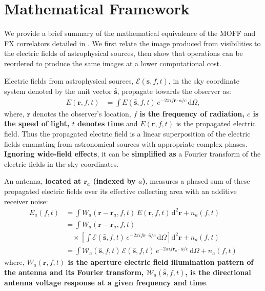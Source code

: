 \documentclass[a4paper,fleqn,usenatbib]{mnras}
\newcommand{\dif}{\mathrm{d}}
\begin{document}
\section{Mathematical Framework}\label{sec:math}

We provide a brief summary of the mathematical equivalence of the MOFF and 
FX correlators detailed in \citet{mor11}. We first relate the image produced 
from visibilities to the electric fields of astrophysical sources, then show that 
operations can be reordered to produce the same images at a lower 
computational cost.

Electric fields from astrophysical sources, $\mathcal{E}(\hat{\mathbf{s}}, f, t)$, in the sky coordinate system denoted by the unit vector $\hat{\mathbf{s}}$, propagate towards the observer as:
\begin{align}
  E(\mathbf{r}, f, t) &= \int E(\hat{\mathbf{s}},f,t)\,e^{-2\pi i f\mathbf{r}\cdot\hat{\mathbf{s}}/c}\,\dif\Omega,
\end{align}
where, $\mathbf{r}$ denotes the observer's location, {\bf $f$ is the frequency of radiation, $c$ is the speed of light, $t$ denotes time} and $E(\mathbf{r}, f, t)$ is the propagated electric field. Thus the propagated electric field is a linear superposition of the electric fields emanating from astronomical sources with appropriate complex phases. {\bf Ignoring wide-field effects}, it can be {\bf simplified as} a Fourier transform of the electric fields in the sky coordinates. 

An antenna, {\bf located at $\mathbf{r}_a$ (indexed by $a$)}, measures a phased sum of these propagated electric fields over its effective collecting area with an additive receiver noise:
\begin{align}\label{eqn:measured-E-field}
  E_a(f,t) &= \int W_a(\mathbf{r}-\mathbf{r}_a,f,t)\,E(\mathbf{r},f,t)\,\dif^2\mathbf{r} + n_a(f,t) \\
           &= \int W_a(\mathbf{r}-\mathbf{r}_a,f,t) \nonumber \\
           &\quad \times \left[ \int \mathcal{E}(\hat{\mathbf{s}},f,t)\,e^{-2\pi i f\mathbf{r}\cdot\hat{\mathbf{s}}/c}\,\dif\Omega \right] \dif^2\mathbf{r} + n_a(f,t) \\
           &= \int \mathcal{W}_a(\hat{\mathbf{s}},f,t)\,\mathcal{E}(\hat{\mathbf{s}},f,t)\,e^{-2\pi i f\mathbf{r}_a\!\cdot\,\hat{\mathbf{s}}/c}\,\dif\Omega + n_a(f,t)
\end{align}
where, {\bf $W_a(\mathbf{r},f,t)$ is the aperture electric field illumination pattern of the antenna and its Fourier transform, $\mathcal{W}_a(\hat{\mathbf{s}},f,t)$, is the directional antenna voltage response at a given frequency and time}.
\end{document}
